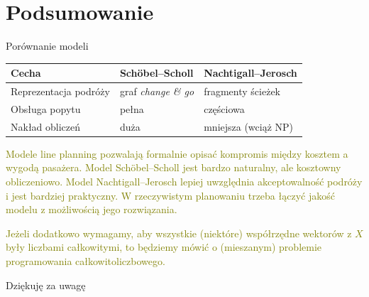 \documentclass[ignorenonframetext]{beamer}
\begin{document}
\section{Podsumowanie}


\begin{frame}{Porównanie modeli}
  \small
  \begin{tabular}{p{} p{} p{}}
    \textbf{Cecha} & \textbf{Schöbel--Scholl} & \textbf{Nachtigall--Jerosch} \\
    \hline
    Reprezentacja podróży & graf \emph{change \& go} & fragmenty ścieżek \\
    Obsługa popytu & pełna & częściowa \\
    Nakład obliczeń & duża & mniejsza (wciąż NP) \\
  \end{tabular}
\end{frame}

\textcolor{olive} {
  Modele line planning pozwalają formalnie opisać kompromis między kosztem a wygodą pasażera. Model Schöbel--Scholl jest bardzo naturalny, ale kosztowny obliczeniowo. Model Nachtigall--Jerosch lepiej uwzględnia akceptowalność podróży i jest bardziej praktyczny. W rzeczywistym planowaniu trzeba łączyć jakość modelu z możliwością jego rozwiązania.
}

\textcolor{olive} { 
  Jeżeli dodatkowo wymagamy, aby wszystkie (niektóre) współrzędne wektorów z \(X\) były liczbami całkowitymi, to będziemy mówić o (mieszanym) problemie programowania całkowitoliczbowego.
}

\begin{frame}{Dziękuję za uwagę}
  \nocite{*}
  \printbibliography
\end{frame}
\end{document}
